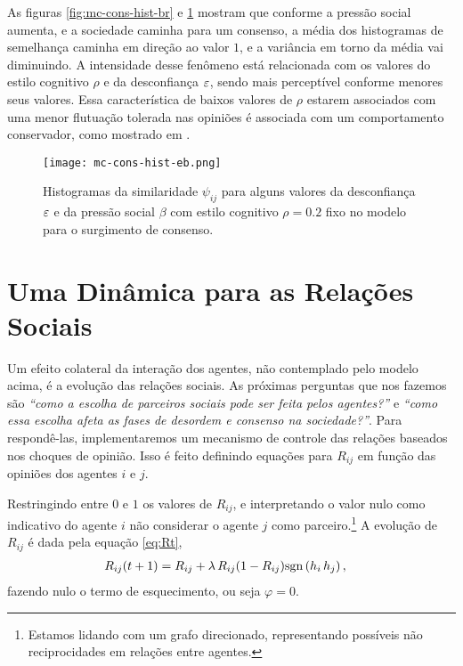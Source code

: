 As figuras \ref{fig:mc-cons-hist-br} e \ref{fig:mc-cons-hist-be} mostram que conforme a pressão social aumenta, e a sociedade caminha para um consenso, a média dos histogramas de semelhança caminha em direção ao valor $1$, e a variância em torno da média vai diminuindo.
A intensidade desse fenômeno está relacionada com os valores do estilo cognitivo $\rho$ e da desconfiança $\varepsilon$, sendo mais perceptível conforme menores seus valores.
Essa característica de baixos valores de $\rho$ estarem associados com uma menor flutuação tolerada nas opiniões é associada com um comportamento conservador, como mostrado em \parencite{Cesar2014,Vicente2014,Caticha2011}.
\begin{figure}[h!]\label{fig:mc-cons-hist-be}
    \centering
    \texttt{[image: mc-cons-hist-eb.png]}
    \caption{Histogramas da similaridade $\psi_{ij}$ para alguns valores da desconfiança $\varepsilon$ e da pressão social $\beta$ com estilo cognitivo $\rho=0.2$ fixo no modelo para o surgimento de consenso.}
\end{figure}

\section{Uma Dinâmica para as Relações Sociais}
\label{sec:DRS}

Um efeito colateral da interação dos agentes, não contemplado pelo modelo acima, é a evolução das relações sociais.
As próximas perguntas que nos fazemos são \emph{``como a escolha de parceiros sociais pode ser feita pelos agentes?''} e \emph{``como essa escolha afeta as fases de desordem e consenso na sociedade?''}.
Para respondê-las, implementaremos um mecanismo de controle das relações baseados nos choques de opinião.
Isso é feito definindo equações para $R_{ij}$ em função das opiniões dos agentes $i$ e $j$.

Restringindo entre $0$ e $1$ os valores de $R_{ij}$, e interpretando o valor nulo como indicativo do agente $i$ não considerar o agente $j$ como parceiro.\footnote{Estamos lidando com um grafo direcionado, representando possíveis não reciprocidades em relações entre agentes.}
A evolução de $R_{ij}$ é dada pela equação \eqref{eq:Rt},
\begin{align}
  R_{ij}(t+1) & = R_{ij} + \lambda\,R_{ij}(1-R_{ij})\sgn\inpr{h_i\,h_j}, \label{eq:Rijt}
\end{align}
fazendo nulo o termo de esquecimento, ou seja $\varphi = 0$.


